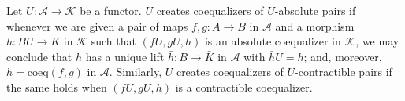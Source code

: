 Let $U: \mathcal{A} \longrightarrow \mathcal{K}$ be a functor. $U$ creates coequalizers of $U$-absolute pairs if whenever we are given a pair of maps $f, g: A \longrightarrow B$ in $\mathcal{A}$ and a morphism $h: BU \longrightarrow K$ in $\mathcal{K}$ such that $(fU, gU, h)$ is an absolute coequalizer in $\mathcal{K}$, we may conclude that $h$ has a unique lift $\bar{h}: B \longrightarrow \bar{K}$ in $\mathcal{A}$ with $\bar{h}U = h$; and, moreover, $\bar{h} = \mathrm{coeq}(f, g)$ in $\mathcal{A}$. Similarly, $U$ creates coequalizers of $U$-contractible pairs if the same holds when $(fU, gU, h)$ is a contractible coequalizer.

